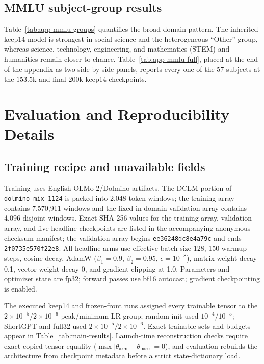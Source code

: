 \subsection{MMLU subject-group results}
\label{app:mmlu-subjects}


Table~\ref{tab:app-mmlu-groups} quantifies the broad-domain pattern. The inherited keep14 model is strongest in
social science and the heterogeneous ``Other'' group, whereas science, technology, engineering, and mathematics (STEM) and humanities
remain closer to chance. Table~\ref{tab:app-mmlu-full}, placed at the
end of the appendix as two side-by-side panels, reports every one of the 57
subjects at the $153.5$k and final $200$k keep14 checkpoints.

\section{Evaluation and Reproducibility Details}
\label{app:repro}

\subsection{Training recipe and unavailable fields}
Training uses English OLMo-2/Dolmino artifacts. The DCLM portion of
\texttt{dolmino-mix-1124} is packed into 2,048-token windows; the training array
contains 7,570,911 windows and the fixed in-domain validation array contains
4,096 disjoint windows. Exact SHA-256 values for the training array, validation array, and five
headline checkpoints are listed in the accompanying anonymous checksum
manifest; the validation array begins \texttt{ee36248dc8e4a79c} and ends
\texttt{2f0735e570f22e8}. All headline arms use effective
batch size 128, 150 warmup steps, cosine decay, AdamW
($\beta_1{=}0.9$, $\beta_2{=}0.95$, $\epsilon{=}10^{-8}$), matrix weight decay
0.1, vector weight decay 0, and gradient clipping at 1.0. Parameters and
optimizer state are fp32; forward passes use bf16 autocast; gradient
checkpointing is enabled.

The executed keep14 and frozen-front runs assigned every trainable tensor to
the $2\times10^{-5}/2\times10^{-6}$ peak/minimum LR group; random-init used
$10^{-4}/10^{-5}$; ShortGPT and full32 used
$2\times10^{-5}/2\times10^{-6}$. Exact trainable sets and budgets appear in
Table~\ref{tab:main-results}. Launch-time reconstruction checks require exact
copied-tensor equality ($\max|\theta_{\mathrm{arm}}-\theta_{\mathrm{base}}|=0$),
and evaluation rebuilds the architecture from checkpoint metadata before a
strict state-dictionary load.

